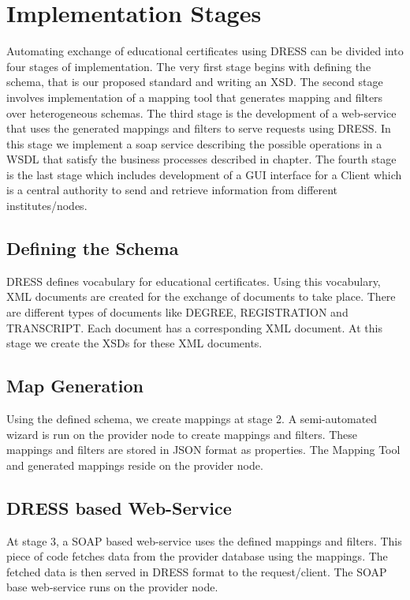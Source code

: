 \documentclass[12pt,a4paper,oneside]{book}
\begin{document}
\section{Implementation Stages}
Automating exchange of educational certificates using DRESS can be divided into four stages of implementation. The very first stage begins with defining the schema, that is our proposed standard and writing an XSD. The second stage involves implementation of a mapping tool that generates mapping and filters over heterogeneous schemas. The third stage is the development of a web-service that uses the generated mappings and filters to serve requests using DRESS. In this stage we implement a soap service describing the possible operations in a WSDL that satisfy the business processes described in chapter. The fourth stage is the last stage which includes development of a GUI interface for a Client which is a central authority to send and retrieve information from different institutes/nodes.
 
\subsection{Defining the Schema}
DRESS defines vocabulary for educational certificates. Using this vocabulary, XML documents are created for the exchange of documents to take place. There are different types of documents like DEGREE, REGISTRATION and TRANSCRIPT. Each document has a corresponding XML document. At this stage we create the XSDs for these XML documents.

\subsection{Map Generation}
Using the defined schema, we create mappings at stage 2. A semi-automated wizard is run on the provider node to create mappings and filters. These mappings and filters are stored in JSON format as properties.  The Mapping Tool and generated mappings reside on the provider node.

\subsection{DRESS based Web-Service}
At stage 3, a SOAP based web-service uses the defined mappings and filters. This piece of code fetches data from the provider database using the mappings. The fetched data is then served in DRESS format to the  request/client. The SOAP base web-service runs on the provider node. 
\end{document}
